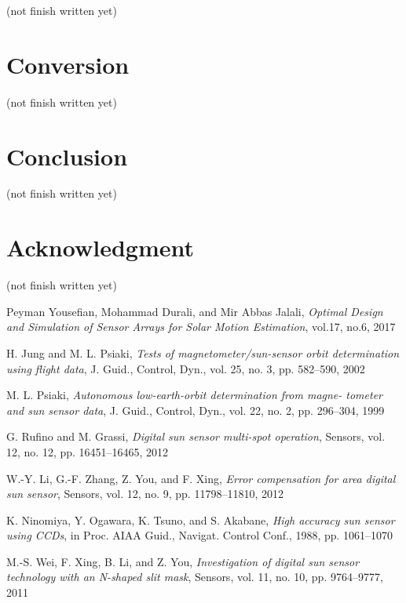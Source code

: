 \documentclass[journal]{IEEEtran}
\begin{document}
(not finish written yet)

\section{Conversion}

(not finish written yet)
 
\section{Conclusion}

(not finish written yet)

\section*{Acknowledgment}

(not finish written yet)

\ifCLASSOPTIONcaptionsoff
  \newpage
\fi

\begin{thebibliography}{1}

Peyman Yousefian, Mohammad Durali, and Mir Abbas Jalali, 
\emph{Optimal Design and Simulation of Sensor Arrays for Solar Motion Estimation},
vol.17, no.6, 2017

H. Jung and M. L. Psiaki, 
\emph{Tests of magnetometer/sun-sensor orbit determination using flight data},
J. Guid., Control, Dyn., vol. 25, no. 3, pp. 582–590, 2002

M. L. Psiaki, 
\emph{Autonomous low-earth-orbit determination from magne- tometer and sun sensor data},
J. Guid., Control, Dyn., vol. 22, no. 2, pp. 296–304, 1999

G. Rufino and M. Grassi, 
\emph{Digital sun sensor multi-spot operation},
Sensors, vol. 12, no. 12, pp. 16451–16465, 2012

W.-Y. Li, G.-F. Zhang, Z. You, and F. Xing,
\emph{Error compensation for area digital sun sensor},
Sensors, vol. 12, no. 9, pp. 11798–11810, 2012

K. Ninomiya, Y. Ogawara, K. Tsuno, and S. Akabane,
\emph{High accuracy sun sensor using CCDs},
in Proc. AIAA Guid., Navigat. Control Conf., 1988, pp. 1061–1070

M.-S. Wei, F. Xing, B. Li, and Z. You,
\emph{Investigation of digital sun sensor technology with an N-shaped slit mask},
Sensors, vol. 11, no. 10, pp. 9764–9777, 2011

\end{thebibliography}
\end{document}
